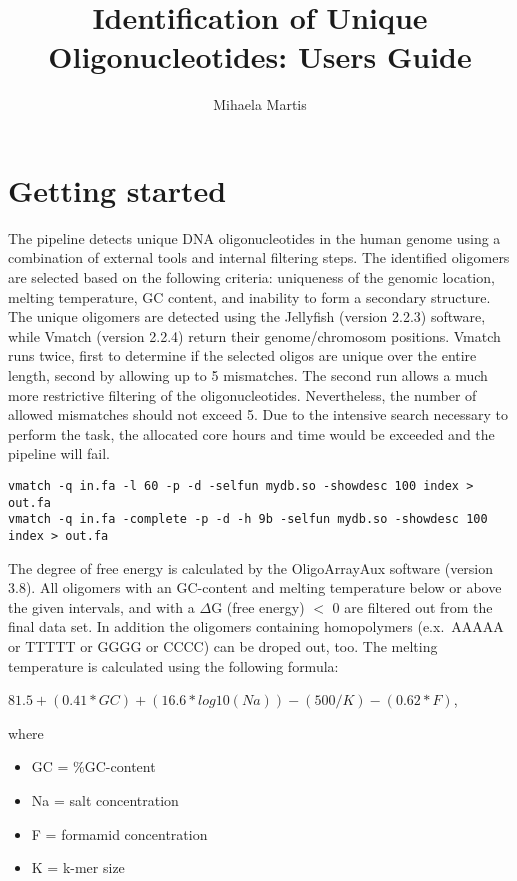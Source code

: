 \documentclass[a4paper,10pt]{report}
\title{Identification of Unique Oligonucleotides: Users Guide}
\author{Mihaela Martis}
\begin{document}
\maketitle
\section{Getting started}
\label{sec:start}
The pipeline detects unique DNA oligonucleotides in the human genome using a combination of external tools and internal filtering steps. The identified
oligomers are selected based on the following criteria: uniqueness of the genomic location, melting temperature, GC content, and inability to form a
secondary structure. The unique oligomers are detected using the Jellyfish (version 2.2.3) software, while Vmatch (version 2.2.4) return their genome/chromosom
positions. Vmatch runs twice, first to determine if the selected oligos are unique over the entire length, second by allowing up to 5 mismatches. The second
run allows a much more restrictive filtering of the oligonucleotides. Nevertheless, the number of allowed mismatches should not exceed 5. Due to the intensive
search necessary to perform the task, the allocated core hours and time would be exceeded and the pipeline will fail.
\begin{lstlisting}[basicstyle=\tiny]
vmatch -q in.fa -l 60 -p -d -selfun mydb.so -showdesc 100 index > out.fa
vmatch -q in.fa -complete -p -d -h 9b -selfun mydb.so -showdesc 100 index > out.fa
\end{lstlisting}
The degree of free energy is calculated by the OligoArrayAux software (version 3.8). All oligomers with an GC-content and melting temperature below
or above the given intervals, and with a $\Delta$G (free energy) $<$ 0 are filtered out from the final data set. In addition the oligomers containing homopolymers
(e.x.~AAAAA or TTTTT or GGGG or CCCC) can be droped out, too. The melting temperature is calculated using the following formula:\\
\begin{center}
  $81.5 + (0.41 * GC) + (16.6 * log10(Na)) - (500/K) - (0.62 * F)$,\\
\end{center}
where
\begin{itemize}
 \item[]GC = \%GC-content
 \item[]Na = salt concentration
 \item[]F  = formamid concentration
 \item[]K  = k-mer size
\end{itemize}
\end{document}
